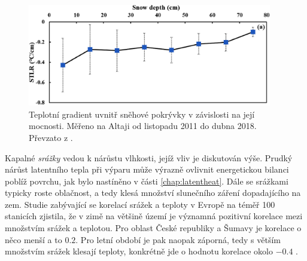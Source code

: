 \begin{figure}
	\centering
	\includegraphics[width=0.95\textwidth]{img/ch1/snowlapserate.png}
	\caption{Teplotní gradient uvnitř sněhové pokrývky v závislosti na její mocnosti. Měřeno na Altaji od listopadu 2011 do dubna 2018. Převzato z \parencite{zhangwei2021}.}
	\label{fig:snowlapserate}
\end{figure}



Kapalné \textit{srážky} vedou k nárůstu vlhkosti, jejíž vliv je diskutován výše. Prudký nárůst latentního tepla při výparu může výrazně ovlivnit energetickou bilanci poblíž povrchu, jak bylo nastíněno v části \ref{chap:latentheat}. Dále se srážkami typicky roste oblačnost, a tedy klesá množství slunečního záření dopadajícího na zem. Studie zabývající se korelací srážek a teploty v Evropě na téměř 100 stanicích zjistila, že v zimě na většině území je významná pozitivní korelace mezi množstvím srážek a teplotou. Pro oblast České republiky a Šumavy je korelace o něco menší a to $0.2$. Pro letní období je pak naopak záporná, tedy s větším množstvím srážek klesají teploty, konkrétně jde o hodnotu korelace okolo $-0.4$ \parencite{maddenroland1978}.


